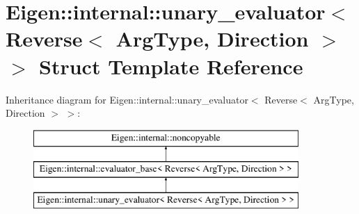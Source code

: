 \hypertarget{struct_eigen_1_1internal_1_1unary__evaluator_3_01_reverse_3_01_arg_type_00_01_direction_01_4_01_4}{}\section{Eigen\+::internal\+::unary\+\_\+evaluator$<$ Reverse$<$ Arg\+Type, Direction $>$ $>$ Struct Template Reference}
\label{struct_eigen_1_1internal_1_1unary__evaluator_3_01_reverse_3_01_arg_type_00_01_direction_01_4_01_4}
Inheritance diagram for Eigen\+::internal\+::unary\+\_\+evaluator$<$ Reverse$<$ Arg\+Type, Direction $>$ $>$\+:\begin{figure}[H]
\begin{center}
\leavevmode
\includegraphics[height=3.000000cm]{struct_eigen_1_1internal_1_1unary__evaluator_3_01_reverse_3_01_arg_type_00_01_direction_01_4_01_4}
\end{center}
\end{figure}
